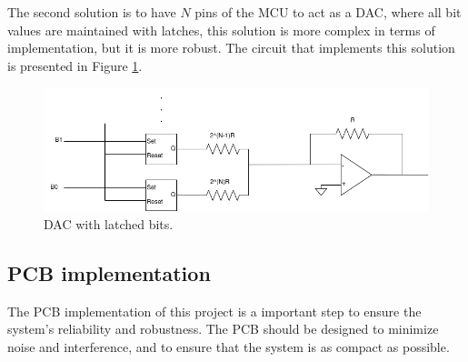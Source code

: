 The second solution is to have $N$ pins of the MCU to act as a DAC, where all bit values are maintained with latches, this solution is more complex in terms of implementation, but it is more robust. The circuit that implements this solution is presented in Figure \ref{fig:LatchDAC}.

\begin{figure}[H]
    \centering
    \includegraphics*[scale = 0.5]{Images/LatchCirc.png}
    \caption{DAC with latched bits.}
    \label{fig:LatchDAC}
\end{figure}

\subsection{PCB implementation}

The PCB implementation of this project is a important step to ensure the system's reliability and robustness. The PCB should be designed to minimize noise and interference, and to ensure that the system is as compact as possible.